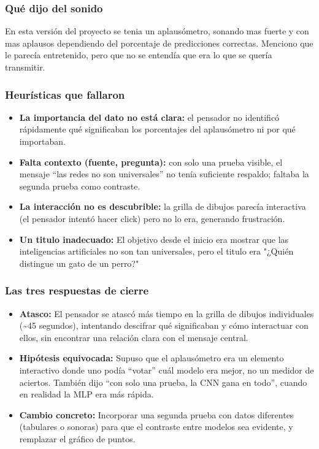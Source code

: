 \documentclass{article}
\begin{document}
\subsubsection{Qu\'{e} dijo del sonido}

En esta versión del proyecto se tenia un aplausómetro, sonando mas fuerte y con mas aplausos dependiendo del porcentaje de predicciones correctas. Menciono que le parecía entretenido, pero que no se entendía que era lo que se quería transmitir. 

\subsubsection{Heur\'{i}sticas que fallaron}

\begin{itemize}
  \item \textbf{La importancia del dato no est\'{a} clara:} el pensador no identific\'{o}
        r\'{a}pidamente qu\'{e} significaban los porcentajes del aplaus\'{o}metro ni por qu\'{e}
        importaban.
  \item \textbf{Falta contexto (fuente, pregunta):} con solo una prueba visible, el mensaje
        ``las redes no son universales'' no ten\'{i}a suficiente respaldo; faltaba la segunda
        prueba como contraste. 
  \item \textbf{La interacci\'{o}n no es descubrible:} la grilla de dibujos parec\'{i}a
        interactiva (el pensador intent\'{o} hacer click) pero no lo era, generando frustraci\'{o}n.
  \item \textbf{Un titulo inadecuado:} El objetivo desde el inicio era mostrar que las inteligencias artificiales no son tan universales, pero el titulo era "¿Quién distingue un gato de un perro?"
\end{itemize}

\subsubsection{Las tres respuestas de cierre}

\begin{itemize}
  \item \textbf{Atasco:} El pensador se atasc\'{o} m\'{a}s tiempo en la grilla de dibujos
        individuales (\textasciitilde{}45 segundos), intentando descifrar qu\'{e} significaban
        y c\'{o}mo interactuar con ellos, sin encontrar una relaci\'{o}n clara con el mensaje
        central.
  \item \textbf{Hip\'{o}tesis equivocada:} Supuso que el aplaus\'{o}metro era un elemento
        interactivo donde uno pod\'{i}a ``votar'' cu\'{a}l modelo era mejor, no un medidor de
        aciertos. Tambi\'{e}n dijo ``con solo una prueba, la CNN gana en todo'', cuando en
        realidad la MLP era m\'{a}s r\'{a}pida.
  \item \textbf{Cambio concreto:} Incorporar una segunda prueba con datos diferentes (tabulares o sonoras)
        para que el contraste entre modelos sea evidente, y remplazar el gráfico de puntos.
\end{itemize}
\end{document}
